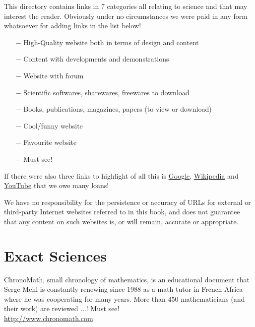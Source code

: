 	This directory contains links in 7 categories all relating to science and that may interest the reader. Obviously under no circumstances we were paid in any form whatsoever for adding links in the list below!
	
	\begin{itemize}	 
		\item[$-$] {\Large {}} High-Quality website both in terms of design and content
		\item[$-$] {\Large {}} Content with developments and demonstrations
		\item[$-$] {\Large {}} Website with forum
		\item[$-$] {\Large {}} Scientific softwares, sharewares, freewares to download
		\item[$-$] {\Large {}} Books, publications, magazines, papers (to view or download)
		\item[$-$] {\Large {}} Cool/funny website
		\item[$-$] {\Large {}} Favourite website
		\item[$-$] {\Large {}} Must see!
	\end{itemize}
	
	If there were also three links to highlight of all this is \href{http://www.google.com}{\color{blue} Google}, \href{http://www.wikipedia.com}{\color{blue} Wikipedia} and \href{http://www.youtube.com}{\color{blue} YouTube} that we owe many loans!	
		
	\begin{tcolorbox}[title=Remark,colframe=black,arc=10pt]
	We have no responsibility for the persistence or accuracy of URLs for external or third-party Internet websites referred to in this book, and does not guarantee that any content on such websites is, or will remain, accurate or appropriate. 
	\end{tcolorbox}
	
	\pagebreak

	\section{Exact Sciences}

	{\Large {}}{\Large {}}{\Large {}}{\Large {}}{\Large {}}{\Large {}}\bcdfrance{} ChronoMath, small chronology of mathematics, is an educational document that Serge Mehl is constantly renewing since 1988 as a math tutor in French Africa where he was cooperating for many years. More than 450 mathematicians (and their work) are reviewed ...! Must see!\\
	\href{http://www.chronomath.com}{\color{blue} http://www.chronomath.com}
	

